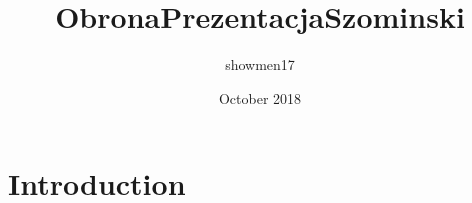 \documentclass{article}
\title{ObronaPrezentacjaSzominski}
\author{showmen17 }
\date{October 2018}
\begin{document}
\maketitle

\section{Introduction}
\end{document}
